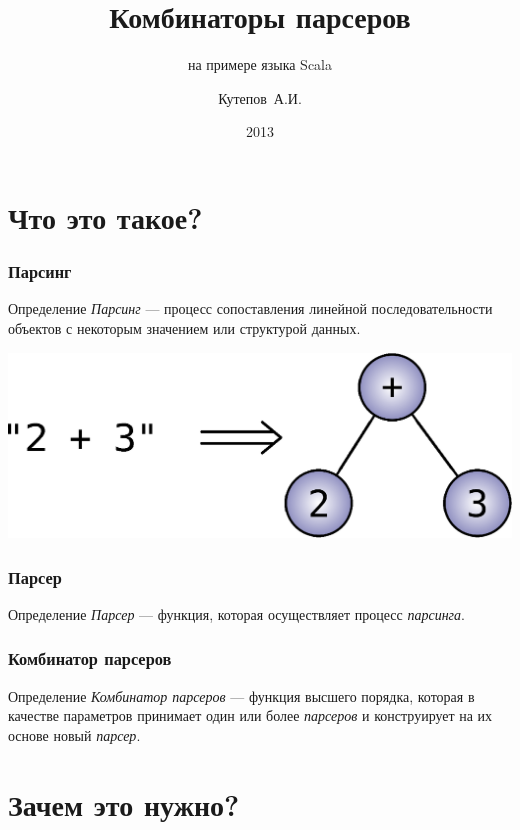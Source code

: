 \documentclass{beamer}
\title{Комбинаторы парсеров}
\subtitle{на примере языка Scala}
\author{Кутепов~А.И.}
\date{2013}
\begin{document}
\begin{frame}
  \titlepage
\end{frame}

\begin{frame}
  \tableofcontents
\end{frame}

\section{Что это такое?}

\begin{frame}
  \frametitle{Парсинг}
  \pause
  \begin{block}{Определение}
    \textit{Парсинг} --- процесс сопоставления линейной
    последовательности объектов с некоторым значением или структурой
    данных.
  \end{block}
  \pause
  \includegraphics[scale=0.50]{images/parsing-example.eps}
\end{frame}

\begin{frame}
  \frametitle{Парсер}
  \begin{block}{Определение}
    \textit{Парсер} --- функция, которая осуществляет процесс
    \textit{парсинга}.
  \end{block}
\end{frame}

\begin{frame}
  \frametitle{Комбинатор парсеров}
  \begin{block}{Определение}
    \textit{Комбинатор парсеров} --- функция высшего порядка, которая
    в качестве параметров принимает один или более \textit{парсеров} и
    конструирует на их основе новый \textit{парсер}.
  \end{block}
\end{frame}

\section{Зачем это нужно?}
\end{document}
